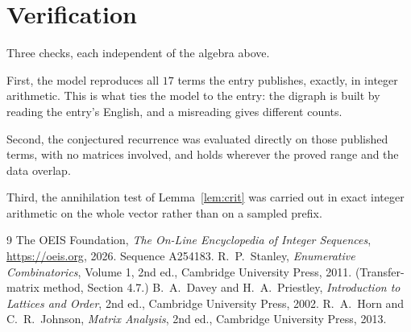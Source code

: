 \documentclass[11pt,a4paper]{article}
\theoremstyle{plain}
\theoremstyle{definition}
\begin{document}
\section{Verification}

Three checks, each independent of the algebra above.

First, the model reproduces all $17$ terms the entry publishes, exactly, in integer
arithmetic. This is what ties the model to the entry: the digraph is built by reading the
entry's English, and a misreading gives different counts.

Second, the conjectured recurrence was evaluated directly on those published terms, with no
matrices involved, and holds wherever the proved range and the data overlap.

Third, the annihilation test of Lemma~\ref{lem:crit} was carried out in exact integer
arithmetic on the whole vector rather than on a sampled prefix.

\begin{thebibliography}{9}
 The OEIS Foundation, \emph{The On-Line Encyclopedia of Integer
Sequences}, \url{https://oeis.org}, 2026. Sequence A254183.
 R.~P.~Stanley, \emph{Enumerative Combinatorics}, Volume 1, 2nd ed.,
Cambridge University Press, 2011. (Transfer-matrix method, Section 4.7.)
 B.~A.~Davey and H.~A.~Priestley, \emph{Introduction to Lattices and
Order}, 2nd ed., Cambridge University Press, 2002.
 R.~A.~Horn and C.~R.~Johnson, \emph{Matrix Analysis}, 2nd ed., Cambridge
University Press, 2013.
\end{thebibliography}
\end{document}
